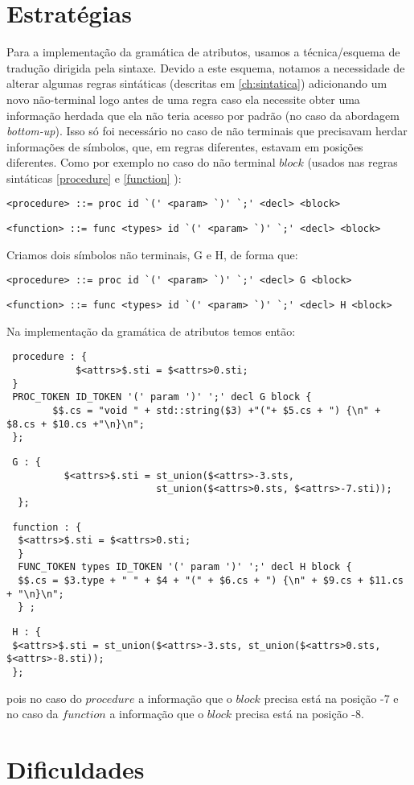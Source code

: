 \section{Estratégias}
Para a implementação da gramática de atributos, usamos a técnica/esquema de tradução dirigida pela sintaxe. Devido a este esquema, notamos a necessidade de alterar algumas regras sintáticas (descritas em \ref{ch:sintatica}) adicionando um novo não-terminal logo antes de uma regra caso ela necessite obter uma informação herdada que ela não teria acesso por padrão (no caso da abordagem \textit{bottom-up}). Isso só foi necessário no caso de não terminais que precisavam herdar informações de símbolos, que,  em regras diferentes, estavam em posições diferentes. Como por exemplo no caso do não terminal $block$ (usados nas regras sintáticas \ref{procedure} e \ref{function}  ):

\begin{lstlisting}[frame=single, language=pie]
<procedure> ::= proc id `(' <param> `)' `;' <decl> <block>
\end{lstlisting}

\begin{lstlisting}[frame=single, language=pie]
<function> ::= func <types> id `(' <param> `)' `;' <decl> <block>
\end{lstlisting}
 Criamos dois símbolos não terminais, G e H, de forma que:
 \begin{lstlisting}[frame=single, language=pie]
 <procedure> ::= proc id `(' <param> `)' `;' <decl> G <block>
 \end{lstlisting}
 
 \begin{lstlisting}[frame=single, language=pie, basicstyle=\small ]
 <function> ::= func <types> id `(' <param> `)' `;' <decl> H <block>
  \end{lstlisting}
  
  Na implementação da gramática de atributos temos então:
 
 \begin{verbatim}
 procedure : {
 			$<attrs>$.sti = $<attrs>0.sti; 
 }
 PROC_TOKEN ID_TOKEN '(' param ')' ';' decl G block {
 		$$.cs = "void " + std::string($3) +"("+ $5.cs + ") {\n" + $8.cs + $10.cs +"\n}\n";
 };
  \end{verbatim}
  \begin{verbatim}
 G : {
		  $<attrs>$.sti = st_union($<attrs>-3.sts,
		                  st_union($<attrs>0.sts, $<attrs>-7.sti)); 
  };
  \end{verbatim}
  \begin{verbatim}
 function : {
  $<attrs>$.sti = $<attrs>0.sti; 
  }
  FUNC_TOKEN types ID_TOKEN '(' param ')' ';' decl H block {
  $$.cs = $3.type + " " + $4 + "(" + $6.cs + ") {\n" + $9.cs + $11.cs + "\n}\n"; 
  } ;
  \end{verbatim}
  \begin{verbatim}
 H : { 
 $<attrs>$.sti = st_union($<attrs>-3.sts, st_union($<attrs>0.sts, $<attrs>-8.sti)); 
 };
 \end{verbatim}
pois no caso do $procedure$ a informação que o $block$ precisa está na posição -7 e no caso da $function$ a informação que o $block$ precisa está na posição -8.

\section{Dificuldades}

